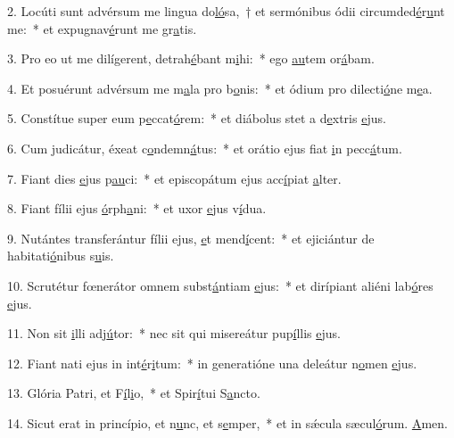 2. Locúti sunt advérsum me lingua do\uline{ló}sa,~† et sermónibus ódii circumded\uline{é}r\uline{u}nt me:~* et expugnav\uline{é}runt me gr\uline{a}tis.\par 
3. Pro eo ut me dilígerent, detrah\uline{é}bant m\uline{i}hi:~* ego \uline{au}tem or\uline{á}bam.\par 
4. Et posuérunt advérsum me m\uline{a}la pro b\uline{o}nis:~* et ódium pro dilecti\uline{ó}ne m\uline{e}a.\par 
5. Constítue super eum p\uline{e}ccat\uline{ó}rem:~* et diábolus stet a d\uline{e}xtris \uline{e}jus.\par 
6. Cum judicátur, éxeat c\uline{o}ndemn\uline{á}tus:~* et orátio ejus fiat \uline{i}n pecc\uline{á}tum.\par 
7. Fiant dies \uline{e}jus p\uline{au}ci:~* et episcopátum ejus acc\uline{í}piat \uline{a}lter.\par 
8. Fiant fílii ejus \uline{ó}rph\uline{a}ni:~* et uxor \uline{e}jus v\uline{í}dua.\par 
9. Nutántes transferántur fílii ejus, \uline{e}t mend\uline{í}cent:~* et ejiciántur de habitati\uline{ó}nibus s\uline{u}is.\par 
10. Scrutétur fœnerátor omnem subst\uline{á}ntiam \uline{e}jus:~* et dirípiant aliéni lab\uline{ó}res \uline{e}jus.\par 
11. Non sit \uline{i}lli adj\uline{ú}tor:~* nec sit qui misereátur pup\uline{í}llis \uline{e}jus.\par 
12. Fiant nati ejus in int\uline{é}r\uline{i}tum:~* in generatióne una deleátur n\uline{o}men \uline{e}jus.\par 
13. Glória Patri, et F\uline{í}l\uline{i}o,~* et Spir\uline{í}tui S\uline{a}ncto.\par 
14. Sicut erat in princípio, et n\uline{u}nc, et s\uline{e}mper,~* et in sǽcula sæcul\uline{ó}rum. \uline{A}men.\par 
